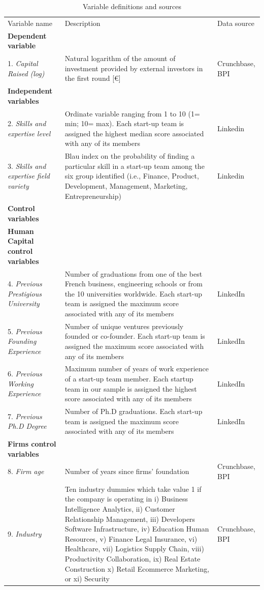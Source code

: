 \documentclass[12pt]{article}
\begin{document}

\begin{table} [ht]
\caption{Variable definitions and sources}
\scriptsize
\renewcommand{\arraystretch}{1.5}
\begin{tabularx}{\textwidth}{ p{5cm} p{7cm} p{2.2cm} }
\toprule
\multicolumn{1}{l}{Variable name}&\multicolumn{1}{l}{Description}&\multicolumn{1}{l}{Data source}\\
\cmidrule(r){1-3}
\textbf{Dependent variable}& &\\
1. \textit{Capital Raised (log)} & Natural logarithm of the amount of investment provided by external investors in the first round [€] & Crunchbase, BPI \\
\textbf{Independent variables}& &\\
2. \textit{Skills and expertise level} & Ordinate variable ranging from 1 to 10 (1= min; 10= max). Each start-up team is assigned the highest median score associated with any of its members & Linkedin\\
3. \textit{Skills and expertise field variety} & Blau index on the probability of finding a particular skill in a start-up team among the six group identified (i.e., Finance, Product, Development, Management, Marketing, Entrepreneurship) & Linkedin \\
\textbf{Control variables}& &\\
\textbf{Human Capital control variables}& &\\
4. \textit{Previous Prestigious University} & Number of graduations from one of the best French business, engineering schools or from the 10 universities worldwide. Each start-up team is assigned the maximum score associated with any of its members & LinkedIn\\
5. \textit{Previous Founding Experience} & Number of unique ventures previously founded or co-founder. Each start-up team is assigned the maximum score associated with any of its members & LinkedIn\\
6. \textit{Previous Working Experience} & Maximum number of years of work experience of a start-up team member. Each startup team in our sample is assigned the highest score associated with any of its members & LinkedIn\\
7. \textit{Previous Ph.D Degree} & Number of Ph.D graduations. Each start-up team is assigned the maximum score associated with any of its members & LinkedIn\\
\textbf{Firms control variables}& &\\
8. \textit{Firm age} & Number of years since firms' foundation & Crunchbase, BPI\\
9. \textit{Industry} & Ten industry dummies which take value 1 if the company is operating in i) Business Intelligence Analytics, ii) Customer Relationship Management, iii) Developers Software Infrastructure, iv) Education Human Resources, v) Finance Legal Insurance, vi) Healthcare, vii) Logistics Supply Chain, viii) Productivity Collaboration, ix) Real Estate Construction x) Retail Ecommerce Marketing, or xi) Security & Crunchbase, BPI \\
\cmidrule(r){1-3}
\end{tabularx}
\label{table1}
\end{table}
\end{document}

